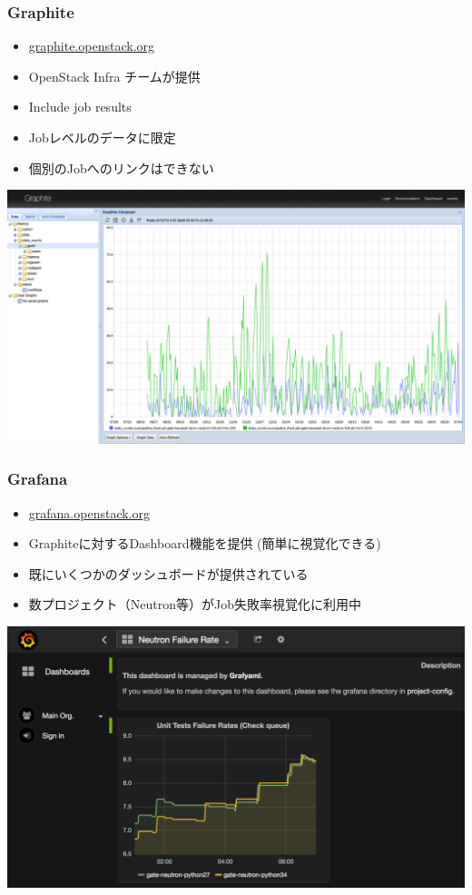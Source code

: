 \documentclass[aspectratio=169,11pt,hyperref={colorlinks=true}]{beamer}
\begin{document}
\begin{frame}
  \frametitle{Graphite}
  \begin{itemize}
    \item \href{http://graphite.openstack.org/}{graphite.openstack.org}
    \item OpenStack Infra チームが提供
    \item Include job results
    \item Jobレベルのデータに限定
    \item 個別のJobへのリンクはできない
  \end{itemize}
  \begin{center}
    \includegraphics[width=.65\textwidth]{graphite-sample.png}
  \end{center}
\end{frame}

\begin{frame}
  \frametitle{Grafana}
  \begin{itemize}
    \item \href{http://grafana.openstack.org/}{grafana.openstack.org}
    \item Graphiteに対するDashboard機能を提供 (簡単に視覚化できる)
    \item 既にいくつかのダッシュボードが提供されている
    \item 数プロジェクト（Neutron等）がJob失敗率視覚化に利用中
  \end{itemize}
  \begin{center}
    \includegraphics[width=.7\textwidth]{grafana-sample.png}
  \end{center}
\end{frame}
\end{document}
